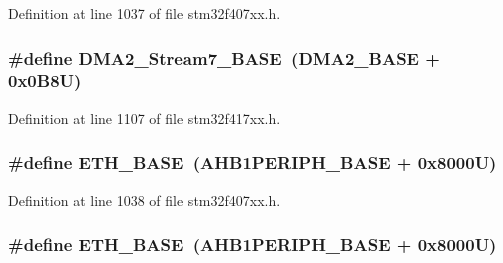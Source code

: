 Definition at line 1037 of file stm32f407xx.\+h.

\subsubsection[{\texorpdfstring{D\+M\+A2\+\_\+\+Stream7\+\_\+\+B\+A\+SE}{DMA2_Stream7_BASE}}]{\setlength{\rightskip}{0pt plus 5cm}\#define D\+M\+A2\+\_\+\+Stream7\+\_\+\+B\+A\+SE~({\bf D\+M\+A2\+\_\+\+B\+A\+SE} + 0x0\+B8\+U)}\hypertarget{group___peripheral__registers__structures_gaa9faa708ad2440d24eb1064cba9bb06d}{}\label{group___peripheral__registers__structures_gaa9faa708ad2440d24eb1064cba9bb06d}


Definition at line 1107 of file stm32f417xx.\+h.

\subsubsection[{\texorpdfstring{E\+T\+H\+\_\+\+B\+A\+SE}{ETH_BASE}}]{\setlength{\rightskip}{0pt plus 5cm}\#define E\+T\+H\+\_\+\+B\+A\+SE~({\bf A\+H\+B1\+P\+E\+R\+I\+P\+H\+\_\+\+B\+A\+SE} + 0x8000\+U)}\hypertarget{group___peripheral__registers__structures_gad965a7b1106ece575ed3da10c45c65cc}{}\label{group___peripheral__registers__structures_gad965a7b1106ece575ed3da10c45c65cc}


Definition at line 1038 of file stm32f407xx.\+h.

\subsubsection[{\texorpdfstring{E\+T\+H\+\_\+\+B\+A\+SE}{ETH_BASE}}]{\setlength{\rightskip}{0pt plus 5cm}\#define E\+T\+H\+\_\+\+B\+A\+SE~({\bf A\+H\+B1\+P\+E\+R\+I\+P\+H\+\_\+\+B\+A\+SE} + 0x8000\+U)}\hypertarget{group___peripheral__registers__structures_gad965a7b1106ece575ed3da10c45c65cc}{}\label{group___peripheral__registers__structures_gad965a7b1106ece575ed3da10c45c65cc}


